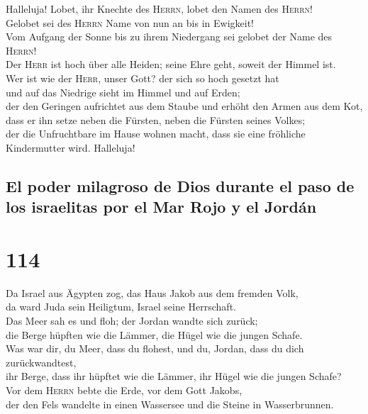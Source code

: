  Halleluja! Lobet, ihr Knechte des \textsc{Herrn}, lobet
den Namen des \textsc{Herrn}!\\
 Gelobet sei des \textsc{Herrn} Name von nun an bis in
Ewigkeit!\\
 Vom Aufgang der Sonne bis zu ihrem Niedergang sei gelobet
der Name des \textsc{Herrn}!\\
 Der \textsc{Herr} ist hoch über alle Heiden; seine Ehre
geht, soweit der Himmel ist.\\
 Wer ist wie der \textsc{Herr}, unser Gott? der sich so
hoch gesetzt hat\\
 und auf das Niedrige sieht im Himmel und auf Erden;\\
 der den Geringen aufrichtet aus dem Staube und erhöht den
Armen aus dem Kot,\\
 dass er ihn setze neben die Fürsten, neben die Fürsten
seines Volkes;\\
 der die Unfruchtbare im Hause wohnen macht, dass sie eine
fröhliche Kindermutter wird. Halleluja!

\hypertarget{el-poder-milagroso-de-dios-durante-el-paso-de-los-israelitas-por-el-mar-rojo-y-el-jorduxe1n}{%
\subsection{El poder milagroso de Dios durante el paso de los israelitas
por el Mar Rojo y el
Jordán}\label{el-poder-milagroso-de-dios-durante-el-paso-de-los-israelitas-por-el-mar-rojo-y-el-jorduxe1n}}

\hypertarget{section-113}{%
\section{114}\label{section-113}}

 Da Israel aus Ägypten zog, das Haus Jakob aus dem fremden
Volk,\\
 da ward Juda sein Heiligtum, Israel seine Herrschaft.\\
 Das Meer sah es und floh; der Jordan wandte sich
zurück;\\
 die Berge hüpften wie die Lämmer, die Hügel wie die
jungen Schafe.\\
 Was war dir, du Meer, dass du flohest, und du, Jordan,
dass du dich zurückwandtest,\\
 ihr Berge, dass ihr hüpftet wie die Lämmer, ihr Hügel wie
die jungen Schafe?\\
 Vor dem \textsc{Herrn} bebte die Erde, vor dem Gott
Jakobs,\\
 der den Fels wandelte in einen Wassersee und die Steine
in Wasserbrunnen.

